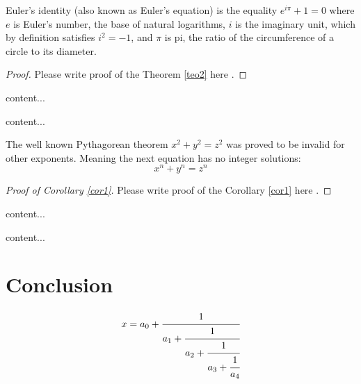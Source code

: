 \documentclass[11pt,reqno]{amsart}
\begin{document}
\begin{theorem}\label{teo2} Euler's identity (also known as Euler's equation) is the equality
$ e^{i\pi}+1=0 $
	where
	$e$  is Euler's number, the base of natural logarithms,
	$i$  is the imaginary unit, which by definition satisfies $i^{2}=-1$, and
	$ \pi $ is pi, the ratio of the circumference of a circle to its diameter.
\end{theorem}

\begin{proof}
Please write proof of the Theorem \ref{teo2} here \cite{bib9}.
\end{proof}

\begin{corollary}\label{cor1}
	content...
\end{corollary}

\begin{proposition}
	content...
\end{proposition}


\lipsum[6]%

The well known Pythagorean theorem \(x^2 + y^2 = z^2\) was 
proved to be invalid for other exponents. 
Meaning the next equation has no integer solutions:
\[ x^n + y^n = z^n \]

\begin{proof}[Proof of Corollary \ref{cor1}]
	Please write proof of the Corollary \ref{cor1} here \cite{gursoy2022construction}.
\end{proof}

\begin{lemma}
	content...
\end{lemma}

\begin{remark}
	content...
\end{remark}


\lipsum[7]%

\section{Conclusion}
\lipsum[3]%

\begin{equation*}
	x = a_0 + \cfrac{1}{a_1 
		+ \cfrac{1}{a_2 
			+ \cfrac{1}{a_3 + \cfrac{1}{a_4} } } }
\end{equation*}

\bigskip
\end{document}
